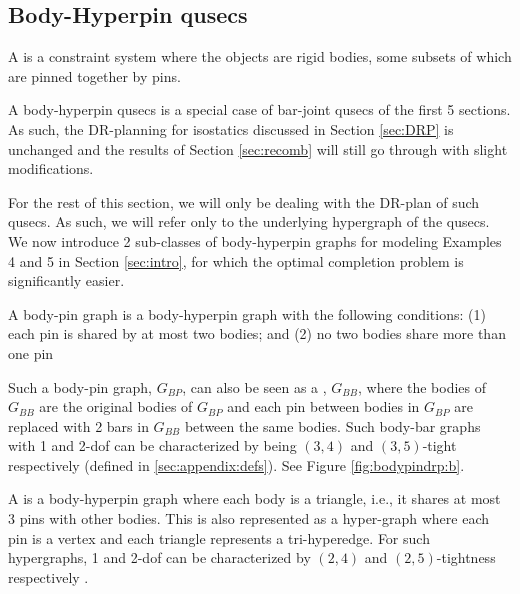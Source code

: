 \subsection{Body-Hyperpin qusecs}


\begin{definition}
    A  is a constraint system where the objects are rigid bodies, some subsets of which are pinned together by pins.
\end{definition}

\begin{remark*}\label{rem:bodypin_is_barjoint}
    A body-hyperpin qusecs is a special case of bar-joint qusecs of the first 5 sections. As such, the DR-planning for isostatics discussed in Section \ref{sec:DRP} is unchanged and the results of Section \ref{sec:recomb} will still go through with slight modifications.
\end{remark*}

For the rest of this section, we will only be dealing with the DR-plan of such qusecs. As such, we will refer only to the underlying hypergraph of the qusecs. We now introduce 2 sub-classes of body-hyperpin graphs for modeling Examples 4 and 5 in Section \ref{sec:intro}, for which the optimal completion problem is significantly easier.

\begin{definition}\label{def:body-pin}
    A body-pin graph is a body-hyperpin graph with the following conditions:
    (1) each pin is shared by at most two bodies; and
    (2) no two bodies share more than one pin

    Such a body-pin graph, $G_{BP}$, can also be seen as a , $G_{BB}$, where the bodies of $G_{BB}$ are the original bodies of $G_{BP}$ and each pin between bodies in $G_{BP}$ are replaced with 2 bars in $G_{BB}$ between the same bodies.
    Such body-bar graphs with 1 and 2-dof can be characterized by being $(3,4)$ and $(3,5)$-tight respectively \cite{Lee:2007:PGA} \cite{streinu2009sparse} (defined in \ref{sec:appendix:defs}). See Figure \ref{fig:bodypindrp:b}.
\end{definition}

\begin{definition}
    A  is a body-hyperpin graph where each body is a triangle, i.e., it shares at most 3 pins with other bodies. This is also represented as a hyper-graph where each pin is a vertex and each triangle represents a tri-hyperedge. For such hypergraphs, 1 and 2-dof can be characterized by $(2,4)$ and $(2,5)$-tightness respectively \cite{Lee:2007:PGA} \cite{streinu2009sparse}.
\end{definition}

